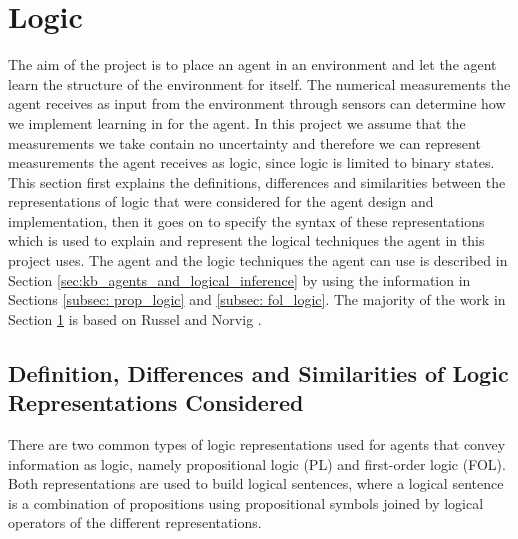 

\section{Logic}
\label{sec:logic}

The aim of the project is to place an agent in an environment and let the agent learn the structure of the environment for itself. The numerical measurements the agent receives as input from the environment through sensors can determine how we implement learning in for the agent. In this project we assume that the measurements we take contain no uncertainty and therefore we can represent measurements the agent receives as logic, since logic is limited to binary states.  This section first explains the definitions, differences and similarities between the representations of logic that were considered for the agent design and implementation, then it goes on to specify the syntax of these representations which is used to explain and represent the logical techniques the agent in this project uses. The agent and the logic techniques the agent can use is described in Section \ref{sec:kb_agents_and_logical_inference} by using the information in Sections \ref{subsec: prop_logic} and \ref{subsec: fol_logic}. The majority of the work in Section \ref{sec:logic} is based on Russel and Norvig \cite{russell2016artificial}.   


\subsection{Definition, Differences and Similarities of Logic Representations Considered}
\label{subsec: diff_sim_logic_reps}

There are two common types of logic representations used for agents that convey information as logic, namely propositional logic (PL) and first-order logic (FOL). 
Both representations are used to build logical sentences, where a logical sentence is a combination of propositions using propositional symbols joined by logical operators of the different representations. 

